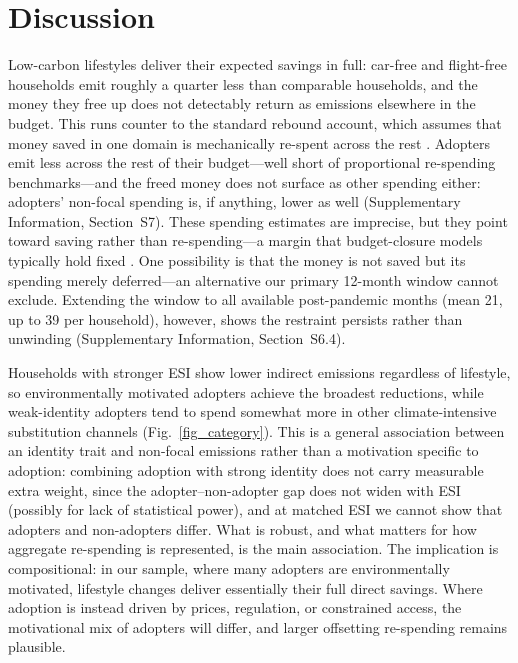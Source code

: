 \documentclass[sn-nature]{sn-jnl}
\begin{document}
\section{Discussion}
Low-carbon lifestyles deliver their expected savings in full: car-free and flight-free households emit roughly a quarter less than comparable households, and the money they free up does not detectably return as emissions elsewhere in the budget. This runs counter to the standard rebound account, which assumes that money saved in one domain is mechanically re-spent across the rest \citep{Berkhout2000,sorrell2020}. Adopters emit less across the rest of their budget---well short of proportional re-spending benchmarks---and the freed money does not surface as other spending either: adopters' non-focal spending is, if anything, lower as well (Supplementary Information, Section~S7). These spending estimates are imprecise, but they point toward saving rather than re-spending---a margin that budget-closure models typically hold fixed \citep{Chitnis2013,Bjelle2018}. One possibility is that the money is not saved but its spending merely deferred---an alternative our primary 12-month window cannot exclude. Extending the window to all available post-pandemic months (mean 21, up to 39 per household), however, shows the restraint persists rather than unwinding (Supplementary Information, Section~S6.4).

Households with stronger ESI show lower indirect emissions regardless of lifestyle, so environmentally motivated adopters achieve the broadest reductions, while weak-identity adopters tend to spend somewhat more in other climate-intensive substitution channels (Fig.~\ref{fig_category}). This is a general association between an identity trait and non-focal emissions rather than a motivation specific to adoption: combining adoption with strong identity does not carry measurable extra weight, since the adopter--non-adopter gap does not widen with ESI (possibly for lack of statistical power), and at matched ESI we cannot show that adopters and non-adopters differ. What is robust, and what matters for how aggregate re-spending is represented, is the main association. The implication is compositional: in our sample, where many adopters are environmentally motivated, lifestyle changes deliver essentially their full direct savings. Where adoption is instead driven by prices, regulation, or constrained access, the motivational mix of adopters will differ, and larger offsetting re-spending remains plausible. 
\end{document}

